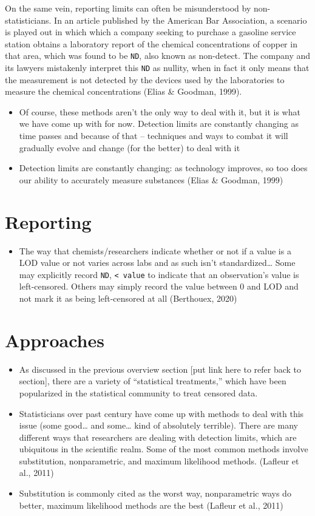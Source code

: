 \documentclass[12pt, twoside]{amherstthesis}
\providecommand{\tightlist}{%
  \setlength{\itemsep}{0pt}\setlength{\parskip}{0pt}}
\begin{document}
On the same vein, reporting limits can often be misunderstood by non-statisticians. In an article published by the American Bar Association, a scenario is played out in which which a company seeking to purchase a gasoline service station obtains a laboratory report of the chemical concentrations of copper in that area, which was found to be \texttt{ND}, also known as non-detect. The company and its lawyers mistakenly interpret this \texttt{ND} as nullity, when in fact it only means that the measurement is not detected by the devices used by the laboratories to measure the chemical concentrations (Elias \& Goodman, 1999).
\begin{itemize}
\item
  Of course, these methods aren't the only way to deal with it, but it is what we have come up with for now. Detection limits are constantly changing as time passes and because of that -- techniques and ways to combat it will gradually evolve and change (for the better) to deal with it
\item
  Detection limits are constantly changing: as technology improves, so too does our ability to accurately measure substances (Elias \& Goodman, 1999)
\end{itemize}
\hypertarget{reporting}{%
\section{Reporting}\label{reporting}}
\begin{itemize}
\tightlist
\item
  The way that chemists/researchers indicate whether or not if a value is a LOD value or not varies across labs and as such isn't standardized\ldots{} Some may explicitly record \texttt{ND}, \texttt{\textless{}\ value} to indicate that an observation's value is left-censored. Others may simply record the value between 0 and LOD and not mark it as being left-censored at all (Berthouex, 2020)
\end{itemize}
\hypertarget{Approaches}{%
\section{Approaches}\label{Approaches}}
\begin{itemize}
\item
  As discussed in the previous overview section {[}put link here to refer back to section{]}, there are a variety of ``statistical treatments,'' which have been popularized in the statistical community to treat censored data.
\item
  Statisticians over past century have come up with methods to deal with this issue (some good\ldots{} and some\ldots{} kind of absolutely terrible). There are many different ways that researchers are dealing with detection limits, which are ubiquitous in the scientific realm. Some of the most common methods involve substitution, nonparametric, and maximum likelihood methods. (Lafleur et al., 2011)
\item
  Substitution is commonly cited as the worst way, nonparametric ways do better, maximum likelihood methods are the best (Lafleur et al., 2011)
\end{itemize}
\end{document}

